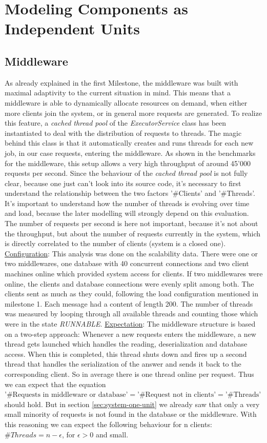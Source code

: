 \documentclass[11pt]{article}
\begin{document}
\section{Modeling Components as Independent Units}\label{sec:independent-units}

\subsection{Middleware}\label{sec:mw}
As already explained in the first Milestone, the middleware was built with maximal adaptivity to the current situation in mind. This means that a middleware is able to dynamically allocate resources on demand, when either more clients join the system, or in general more requests are generated. To realize this feature, a \textit{cached thread pool} of the \textit{ExecutorService} class has been instantiated to deal with the distribution of requests to threads. The magic behind this class is that it automatically creates and runs threads for each new job, in our case requests, entering the middleware. As shown in the benchmarks for the middleware, this setup allows a very high throughput of around 45'000 requests per second. Since the behaviour of the \textit{cached thread pool} is not fully clear, because one just can't look into its source code, it's necessary to first understand the relationship between the two factors '\#Clients' and '\#Threads'. It's important to understand how the number of threads is evolving over time and load, because the later modelling will strongly depend on this evaluation. The number of requests per second is here not important, because it's not about the throughput, but about the number of requests currently in the system, which is directly correlated to the number of clients (system is a closed one).
\newline\underline{Configuration}: This analysis was done on the scalability data. There were one or two middlewares, one database with 40 concurrent connections and two client machines online which provided system access for clients. If two middlewares were online, the clients and database connections were evenly split among both. The clients sent as much as they could, following the load configuration mentioned in milestone 1. Each message had a content of length 200. The number of threads was measured by looping through all available threads and counting those which were in the state \textit{RUNNABLE}.
\newline\underline{Expectation}: The middleware structure is based on a two-step approach: Whenever a new requests enters the middleware, a new thread gets launched which handles the reading, deserialization and database access. When this is completed, this thread shuts down and fires up a second thread that handles the serialization of the answer and sends it back to the corresponding client. So in average there is one thread online per request. Thus we can expect that the equation $\text{'\#Requests in middleware or database'}=\text{'\#Request not in clients'}=\text{'\#Threads'}$ should hold. But in section \ref{sec:system-one-unit} we already saw that only a very small minority of requests is not found in the database or the middleware. With this reasoning we can expect the following behaviour for n clients: $\#Threads=n-\epsilon$, for $\epsilon>0$ and small.
\end{document}
